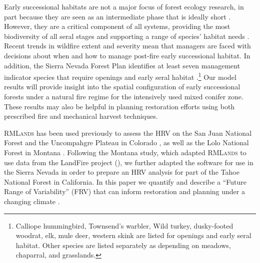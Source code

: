 Early successional habitats are not a major focus of forest ecology research, in part because they are seen as an intermediate phase that is ideally short \citep{Swanson2011}. However, they are a critical component of all systems, providing the most biodiversity of all seral stages and supporting a range of species' habitat needs \citep{Chang1995,Hutto2008,Swanson2011}. Recent trends in wildfire extent and severity mean that managers are faced with decisions about when and how to manage post-fire early successional habitat. In addition, the Sierra Nevada Forest Plan identifies at least seven management indicator species that require openings and early seral habitat \citep{USDAForestService2004}.\footnote{Calliope hummingbird, Townsend's warbler, Wild turkey, dusky-footed woodrat, elk, mule deer, western skink are listed for openings and early seral habitat. Other species are listed separately as depending on meadows, chaparral, and grasslands.} Our model results will provide insight into the spatial configuration of early successional forests under a natural fire regime for the intensively used mixed conifer zone. These results may also be helpful in planning restoration efforts using both prescribed fire and mechanical harvest techniques.

\textsc{RMLands} has been used previously to assess the HRV on the San Juan National Forest and the Uncompahgre Plateau in Colorado \citep{McGarigal2005,McGarigal2005a,Romme2009}, as well as the Lolo National Forest in Montana \citep{Cushman2011}. Following the Montana study, which adapted \textsc{RMLands} to use data from the LandFire project (), we further adapted the software for use in the Sierra Nevada in order to prepare an HRV analysis for part of the Tahoe National Forest in California. In this paper we quantify and describe a ``Future Range of Variability'' (FRV) that can inform restoration and planning under a changing climate \citep{Duncan2010}.


